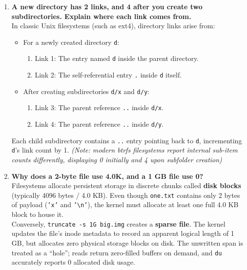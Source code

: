 \documentclass{labreport}
\begin{document}
\begin{enumerate}[leftmargin=*]
    \item \textbf{A new directory has 2 links, and 4 after you create two subdirectories. Explain where each link comes from.}\\[0.2em]
    In classic Unix filesystems (such as ext4), directory links arise from:
    \begin{itemize}[noitemsep, topsep=2pt]
        \item For a newly created directory \texttt{d}:
        \begin{enumerate}[label=(\alph*), noitemsep]
            \item Link 1: The entry named \texttt{d} inside the parent directory.
            \item Link 2: The self-referential entry \texttt{.} inside \texttt{d} itself.
        \end{enumerate}
        \item After creating subdirectories \texttt{d/x} and \texttt{d/y}:
        \begin{enumerate}[label=(\alph*), resume, noitemsep]
            \item Link 3: The parent reference \texttt{..} inside \texttt{d/x}.
            \item Link 4: The parent reference \texttt{..} inside \texttt{d/y}.
        \end{enumerate}
    \end{itemize}
    Each child subdirectory contains a \texttt{..} entry pointing back to \texttt{d}, incrementing \texttt{d}'s link count by 1. \textit{(Note: modern btrfs filesystems report internal sub-item counts differently, displaying 0 initially and 4 upon subfolder creation)}

    \item \textbf{Why does a 2-byte file use 4.0K, and a 1 GB file use 0?}\\[0.2em]
    Filesystems allocate persistent storage in discrete chunks called \textbf{disk blocks} (typically 4096 bytes / 4.0 KB). Even though \texttt{one.txt} contains only 2 bytes of payload (\texttt{'x'} and \texttt{'\textbackslash n'}), the kernel must allocate at least one full 4.0 KB block to house it.\\
    Conversely, \texttt{truncate -s 1G big.img} creates a \textbf{sparse file}. The kernel updates the file's inode metadata to record an apparent logical length of 1 GB, but allocates zero physical storage blocks on disk. The unwritten span is treated as a ``hole''; reads return zero-filled buffers on demand, and \texttt{du} accurately reports 0 allocated disk usage.
\end{enumerate}
\end{document}

